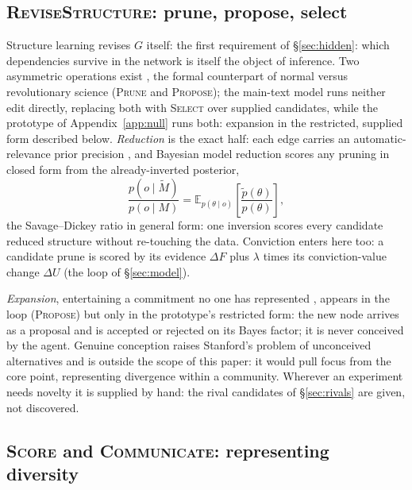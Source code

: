 \documentclass[runningheads]{llncs}
\newcommand{\Eq}[2]{\mathbb{E}_{#1}\!\left[#2\right]}
\begin{document}
\subsection{\textsc{ReviseStructure}: prune, propose, select}
\label{sec:structurelearning}

Structure learning revises $G$ itself: the first
requirement of \S\ref{sec:hidden}: which dependencies survive in the network is itself the
object of inference. Two
asymmetric operations exist \citep{friston2017curiosity,smith2020structure}, the formal
counterpart of normal versus revolutionary science (\textsc{Prune} and \textsc{Propose});
the main-text model runs neither edit directly, replacing both with \textsc{Select} over
supplied candidates, while the prototype of Appendix~\ref{app:null} runs both: expansion in
the restricted, supplied form described below.
\emph{Reduction} is the exact half: each edge carries
an automatic-relevance prior precision \citep{mackay1992,tipping2001}, and Bayesian model
reduction \citep{friston2011,friston2018bmr} scores any pruning in closed form from the
already-inverted posterior,
\begin{equation}
\frac{p(o\mid\tilde M)}{p(o\mid M)}=\Eq{p(\theta\mid o)}{\frac{\tilde p(\theta)}{p(\theta)}},
\label{eq:bmr}
\end{equation}
the Savage--Dickey ratio in general form: one inversion scores every candidate reduced structure
without re-touching the data. Conviction enters here too: a candidate prune is scored by its
evidence $\Delta F$ plus $\lambda$ times its conviction-value change $\Delta U$ (the loop of
\S\ref{sec:model}).

\emph{Expansion}, entertaining a commitment no one has represented
\citep{friston2017curiosity}, appears in the loop (\textsc{Propose}) but only in the prototype's
restricted form: the new node arrives as a proposal and is accepted or rejected on its
Bayes factor; it is never conceived by the agent. Genuine conception raises Stanford's problem
of unconceived alternatives \citep{stanford2006} and is outside the scope of this paper: it
would pull focus from the core point, representing divergence within a community.
Wherever an experiment needs novelty it is supplied by hand: the rival candidates of
\S\ref{sec:rivals} are given, not discovered.

\subsection{\textsc{Score} and \textsc{Communicate}: representing diversity}
\label{sec:reliability}
\end{document}
